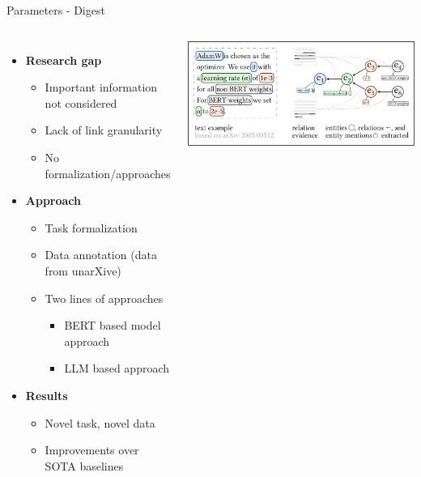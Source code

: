 \documentclass[en,16:9,smallfoot]{sdqbeamer}
\begin{document}
   \begin{frame}{Parameters - Digest}

   \begin{columns}
        \begin{itemize}
            \item \textbf{Research gap}
            \begin{itemize}
                \item Important information not considered
                \item Lack of link granularity
                \item No formalization/approaches
            \end{itemize}
            \item \textbf{Approach}
            \begin{itemize}
                \item Task formalization
                \item Data annotation {\color{lightgrey}(data from unarXive)}
                \item Two lines of approaches
                \begin{itemize}
                    \item BERT based model approach
                    \item LLM based approach
                \end{itemize}
            \end{itemize}
            \item \textbf{Results}
            \begin{itemize}
                \item Novel task, novel data
                \item Improvements over SOTA baselines
            \end{itemize}
        \end{itemize}
            \includegraphics[width=\linewidth]{imgs/hyperpie_schema}

\end{columns}
\end{frame}
\end{document}
